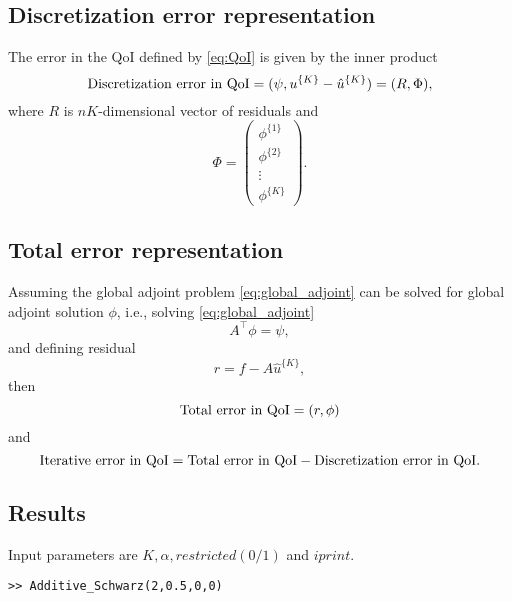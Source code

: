 \subsection{Discretization error representation}
\label{sec:AS_discretization_error_representation}
The error in the QoI defined by \eqref{eq:QoI} is given by the inner product
\begin{equation}
\label{eq:AS_error_representation}
\hbox{Discretization error in QoI} = (\psi, u^{\{K\}}-\hat{u}^{\{K\}}) = (R, \Phi),
\end{equation}
where $R$ is $nK$-dimensional vector of residuals and
\begin{equation}
\Phi = \left( \begin{matrix} \phi^{\{1\}} \\ \phi^{\{2\}} \\ \vdots \\ \phi^{\{K\}} \end{matrix} \right).
\end{equation}


\subsection{Total error representation}
\label{sec:AS_total_error_representation}
Assuming the global adjoint problem \eqref{eq:global_adjoint} can be solved for global adjoint solution $\phi$, i.e., solving \eqref{eq:global_adjoint}
\begin{equation*}
A^\top \phi= \psi,
\end{equation*}
and defining residual
\begin{equation}
r= f-A\hat{u}^{\{K\}},
\end{equation}
then
\begin{equation}
\hbox{Total error in QoI} = (r,\phi)
\end{equation}
and
\begin{equation}
\hbox{Iterative error in QoI} = \hbox{Total error in QoI} - \hbox{Discretization error in QoI}.
\end{equation}

\newpage
\subsection{Results}

Input parameters are {\tt $K, \alpha, restricted (0/1)$} and {\tt $iprint$}.

{\tt >> Additive\_Schwarz(2,0.5,0,0)}

